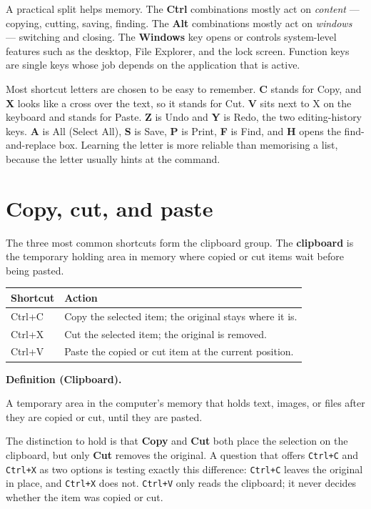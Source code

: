 \documentclass[11pt]{article}
\newenvironment{definitionbox}[1]{%
  \par\noindent\textbf{Definition (#1).}\ \itshape
}{\par\vspace{0.3em}}
\begin{document}
A practical split helps memory. The \textbf{Ctrl} combinations mostly act on
\emph{content} --- copying, cutting, saving, finding. The \textbf{Alt}
combinations mostly act on \emph{windows} --- switching and closing. The
\textbf{Windows} key opens or controls system-level features such as the
desktop, File Explorer, and the lock screen. Function keys are single keys
whose job depends on the application that is active.

Most shortcut letters are chosen to be easy to remember. \textbf{C} stands for
Copy, and \textbf{X} looks like a cross over the text, so it stands for Cut.
\textbf{V} sits next to X on the keyboard and stands for Paste. \textbf{Z} is
Undo and \textbf{Y} is Redo, the two editing-history keys. \textbf{A} is All
(Select All), \textbf{S} is Save, \textbf{P} is Print, \textbf{F} is Find, and
\textbf{H} opens the find-and-replace box. Learning the letter is more reliable
than memorising a list, because the letter usually hints at the command.

\section{Copy, cut, and paste}
The three most common shortcuts form the clipboard group. The
\textbf{clipboard} is the temporary holding area in memory where copied or cut
items wait before being pasted.

\begin{center}
\begin{tabular}{p{}p{}}
\toprule
\textbf{Shortcut} & \textbf{Action} \\
\midrule
Ctrl+C & Copy the selected item; the original stays where it is. \\
Ctrl+X & Cut the selected item; the original is removed. \\
Ctrl+V & Paste the copied or cut item at the current position. \\
\bottomrule
\end{tabular}
\end{center}

\begin{definitionbox}{Clipboard}
A temporary area in the computer's memory that holds text, images, or files
after they are copied or cut, until they are pasted.
\end{definitionbox}

The distinction to hold is that \textbf{Copy} and \textbf{Cut} both place the
selection on the clipboard, but only \textbf{Cut} removes the original. A
question that offers \texttt{Ctrl+C} and \texttt{Ctrl+X} as two options is
testing exactly this difference: \texttt{Ctrl+C} leaves the original in place,
and \texttt{Ctrl+X} does not. \texttt{Ctrl+V} only reads the clipboard; it
never decides whether the item was copied or cut.
\end{document}

